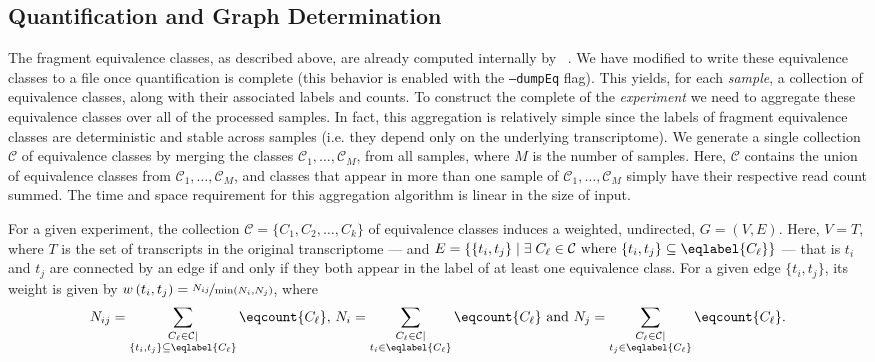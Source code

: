 \subsection{Quantification and Graph Determination}
\label{subsec:ambig_graph}

The fragment equivalence classes, as described above, are already computed internally by \sailfish~\citep{sailfish}. We have modified \sailfish to write these equivalence classes to a file once quantification is complete (this behavior is enabled with the \texttt{--dumpEq} flag).  This yields, for each \textit{sample}, a collection of equivalence classes, along with their associated labels and counts. To construct the complete \ambiggraph of the \textit{experiment} we need to aggregate these equivalence classes over all of the processed samples. In fact, this aggregation is relatively simple since the labels of fragment equivalence classes are deterministic and stable across samples (i.e. they depend only on the underlying transcriptome). We generate a single collection $\mathcal{C}$ of equivalence classes by merging the classes $\mathcal{C}_1, \dots, \mathcal{C}_M$, from all samples, where $M$ is the number of samples. Here, $\mathcal{C}$ contains the union of equivalence classes from $\mathcal{C}_1, \dots, \mathcal{C}_M$, and classes that appear in more than one sample of $\mathcal{C}_1, \dots, \mathcal{C}_M$ simply have their respective read count summed.  The time and space requirement for this aggregation algorithm is linear in the size of input.

For a given experiment, the collection $\mathcal{C} = \{C_1,C_2,\ldots,C_k\}$ of equivalence classes induces a weighted, undirected, \ambiggraph $G = \left(V, E\right)$.  Here, $V = T$, where $T$ is the set of transcripts in the original transcriptome --- and $E = \{ \{t_i, t_j\} \mid \exists\; C_\ell \in \mathcal{C} \text{ where } \{t_i, t_j\} \subseteq \eqlabel{C_\ell}\}$ --- that is $t_i$ and $t_j$ are connected by an edge if and only if they both appear in the label of at least one equivalence class.  For a given edge $\{t_i, t_j\}$, its weight is given by $w\left(t_i, t_j\right) = \nicefrac{N_{ij}}{\min\left(N_i, N_j\right)}$, where
    \[
    N_{ij} = 
    \sum_{\substack{C_\ell \in \mathcal{C} \mid \\ \{t_i, t_j\} \subseteq \eqlabel{C_\ell}}} \eqcount{C_\ell}
        ,\, N_i = \sum_{\substack{C_\ell \in \mathcal{C} \mid \\ t_i \in \eqlabel{C_\ell}}} \eqcount{C_\ell} \text{ and }
    N_j = \sum_{\substack{C_\ell \in \mathcal{C} \mid \\ t_j \in \eqlabel{C_\ell}}} \eqcount{C_\ell}.
    \]

